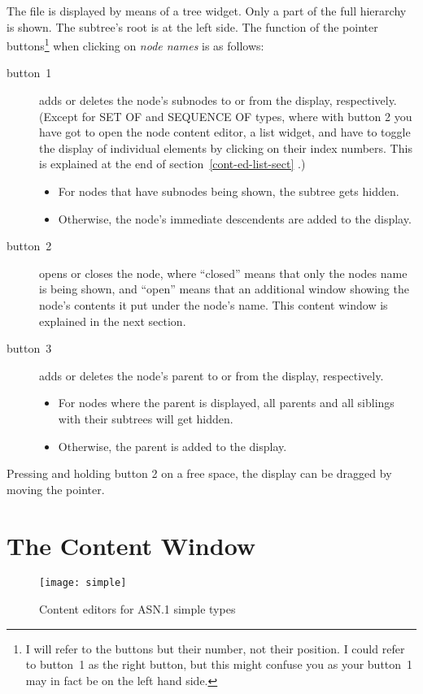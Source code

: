 The file is displayed by means of a tree widget.
Only a part of the full hierarchy is shown.
The subtree's root is at the left side.
The function of the pointer buttons\footnote{
  I will refer to the buttons but their number, not their position.
  I could refer to button~1 as the right button, but this might confuse you as your button~1 may in fact be on the left hand side.
} when clicking on \emph{node names} is as follows:
\begin{description}
  \item[button~1]
    adds or deletes the node's subnodes to or from the display, respectively.
    (Except for SET OF and SEQUENCE OF types, where with button 2 you have got to open the node content editor, a list widget, and have to toggle the display of individual elements by clicking on their index numbers. This is explained at the end of section~\ref{cont-ed-list-sect} .)
    \begin{itemize}
      \item For nodes that have subnodes being shown, the subtree gets hidden.
      \item Otherwise, the node's immediate descendents are added to the display.
    \end{itemize}
  \item[button~2]
    opens or closes the node, where ``closed'' means that only the nodes name is being shown, and ``open'' means that an additional window showing the node's contents it put under the node's name.
    This content window is explained in the next section.
  \item[button~3]
    adds or deletes the node's parent to or from the display, respectively.
    \begin{itemize}
      \item For nodes where the parent is displayed, all parents and all siblings with their subtrees will get hidden.
      \item Otherwise, the parent is added to the display.
    \end{itemize}
\end{description}

Pressing and holding button 2 on a free space, the display can be dragged by moving the pointer.

\section{The Content Window}

\begin{figure}
\begin{center}
\texttt{[image: simple]}
\caption{Content editors for ASN.1 simple types}
\label{simple-content}
\end{center}
\end{figure}

